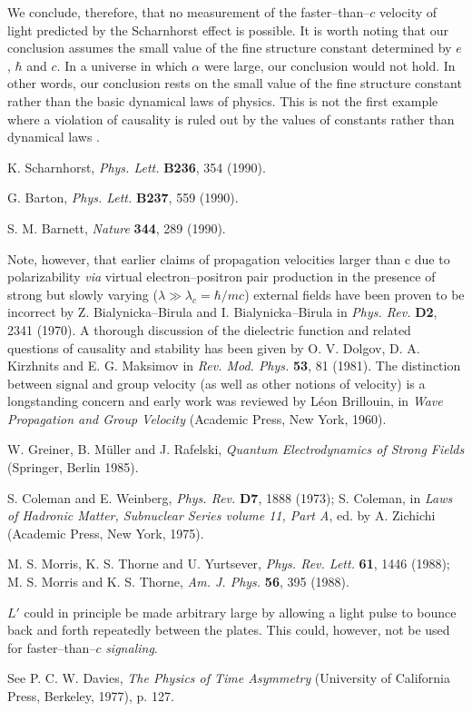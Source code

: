 We conclude, therefore, that no measurement of the faster--than--$c$
velocity of light predicted by the Scharnhorst effect is possible. It is
worth noting that our conclusion assumes the small value of the fine
structure constant determined by $e$, $\hbar$ and $c$.
In a universe in which $\alpha$ were large, our conclusion would not
hold. In other words, our conclusion rests on the small value of the
fine structure constant rather than the basic dynamical laws of physics.
This is not the first example where a violation of causality is ruled
out by the values of constants rather than dynamical laws \cite{davies}.

\begin{thebibliography}{999}
K. Scharnhorst, {\sl Phys. Lett.} {\bf B236}, 354 (1990).

G. Barton, {\sl Phys. Lett.} {\bf B237}, 559 (1990).

S. M. Barnett, {\sl Nature} {\bf 344}, 289 (1990).

Note, however, that earlier claims of propagation velocities larger
than c due to
polarizability {\it via} virtual electron--positron pair production in
the presence of strong but slowly varying ($\lambda \gg \lambda_c=\hbar
/mc$) external
fields have been proven to be incorrect by Z. Bialynicka--Birula and I.
Bialynicka--Birula in {\sl Phys. Rev.} {\bf D2}, 2341 (1970).
A thorough discussion of the dielectric function and related
questions of causality and stability has been given by  O. V. Dolgov, D.
A. Kirzhnits and E. G. Maksimov in {\sl Rev. Mod. Phys.} {\bf 53}, 81
(1981). The distinction between signal and group velocity (as well as
other notions of velocity) is a longstanding concern and early work was
reviewed by L\'eon Brillouin, in {\sl Wave Propagation and Group
Velocity} (Academic Press, New York, 1960).

W. Greiner, B. M\"uller and J. Rafelski, {\sl Quantum Electrodynamics of
Strong Fields} (Springer, Berlin 1985).

S. Coleman and E. Weinberg, {\sl Phys. Rev.} {\bf D7}, 1888 (1973);
S. Coleman, in {\sl Laws of Hadronic Matter, Subnuclear Series volume
11, Part A}, ed. by A. Zichichi (Academic Press, New York, 1975).

M. S. Morris, K. S. Thorne and U. Yurtsever, {\sl Phys. Rev. Lett. }
{\bf 61}, 1446 (1988); M. S. Morris and K. S. Thorne, {\sl Am. J. Phys.}
{\bf 56}, 395 (1988).

 $L'$ could in principle be made arbitrary large by allowing a light
 pulse to bounce back and forth repeatedly between the plates. This
 could, however, not be used for faster--than--$c$ {\it signaling}.

See P. C. W. Davies, {\sl The Physics of Time Asymmetry} (University of
California Press, Berkeley, 1977), p. 127.

\end{thebibliography}

